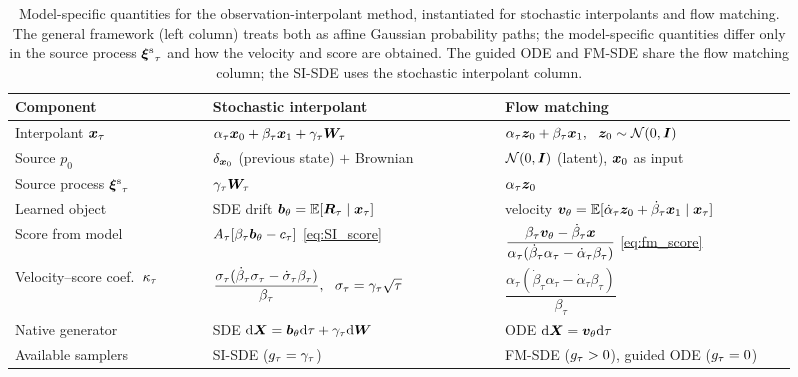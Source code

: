 \begin{table}[ht]
    \centering
    \caption{Model-specific quantities for the observation-interpolant method, instantiated for stochastic interpolants and flow matching. The general framework (left column) treats both as affine Gaussian probability paths; the model-specific quantities differ only in the source process ${\bm{\xi}^{\mathrm{s}}}_\tau$ and how the velocity and score are obtained. The guided ODE and FM-SDE share the flow matching column; the SI-SDE uses the stochastic interpolant column.}
    \label{tab:si_vs_fm}
    \small
    \begin{tabular}{p{0.235\linewidth}|p{0.345\linewidth}|p{0.345\linewidth}}
        \toprule
        \textbf{Component} & \textbf{Stochastic interpolant} & \textbf{Flow matching} \\
        \midrule
        Interpolant $\boldsymbol{x}_\tau$
            & $\alpha_\tau\boldsymbol{x}_0 + \beta_\tau\boldsymbol{x}_1 + \gamma_\tau\boldsymbol{W}_\tau$
            & $\alpha_\tau\latent + \beta_\tau\bx_1,\ \ \latent\sim\mathcal{N}(0,\bI)$ \\
        Source $p_0$
            & $\delta_{\boldsymbol{x}_0}$ (previous state) $+$ Brownian
            & $\mathcal{N}(0,\bm{I})$ (latent), $\boldsymbol{x}_0$ as input \\
        Source process ${\bm{\xi}^{\mathrm{s}}}_\tau$
            & $\gamma_\tau\boldsymbol{W}_\tau$
            & $\alpha_\tau\bm{z}_0$ \\
        Learned object
            & SDE drift $\bm{b}_\theta=\mathbb{E}[\bm{R}_\tau\mid\boldsymbol{x}_\tau]$
            & velocity $\bm{v}_\theta=\mathbb{E}[\dot\alpha_\tau\bm{z}_0+\dot\beta_\tau\boldsymbol{x}_1\mid\boldsymbol{x}_\tau]$ \\
        Score from model
            & $A_\tau[\beta_\tau\bm{b}_\theta - c_\tau]$ \eqref{eq:SI_score}
            & $\dfrac{\beta_\tau\bm{v}_\theta-\dot\beta_\tau\boldsymbol{x}}{\alpha_\tau(\dot\beta_\tau\alpha_\tau-\dot\alpha_\tau\beta_\tau)}$ \eqref{eq:fm_score} \\
        Velocity--score coef.\ $\kappa_\tau$
            & $\dfrac{\sigpath_\tau(\dot\beta_\tau\sigpath_\tau-\dot\sigpath_\tau\beta_\tau)}{\beta_\tau},\ \ \sigpath_\tau=\gamma_\tau\sqrt\tau$
            & $\dfrac{\alpha_\tau(\dot\beta_\tau\alpha_\tau-\dot\alpha_\tau\beta_\tau)}{\beta_\tau}$ \\
        Native generator
            & SDE $\mathrm{d}\boldsymbol{X}=\bm{b}_\theta\mathrm{d}\tau+\gamma_\tau\mathrm{d}\boldsymbol{W}$
            & ODE $\mathrm{d}\boldsymbol{X}=\bm{v}_\theta\mathrm{d}\tau$ \\
        Available samplers
            & SI-SDE ($g_\tau=\gamma_\tau$)
            & FM-SDE ($g_\tau>0$), guided ODE ($g_\tau=0$) \\

\end{tabular}
\end{table}
